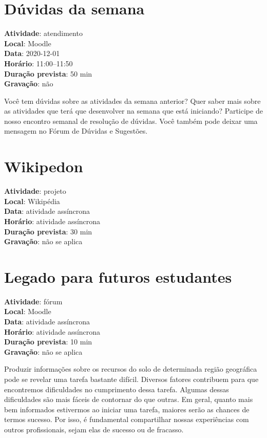 \documentclass[
  11pt,
  a4paper,
  dvipsnames]{tufte-book}
\begin{document}
\hypertarget{duxfavidas-da-semana-12}{%
\section{Dúvidas da semana}\label{duxfavidas-da-semana-12}}

\textbf{Atividade}: atendimento\\
\textbf{Local}: Moodle\\
\textbf{Data}: 2020-12-01\\
\textbf{Horário}: 11:00--11:50\\
\textbf{Duração prevista}: 50 min\\
\textbf{Gravação}: não

Você tem dúvidas sobre as atividades da semana anterior? Quer saber mais sobre as atividades que terá que desenvolver na semana que está iniciando? Participe de nosso encontro semanal de resolução de dúvidas. Você também pode deixar uma mensagem no Fórum de Dúvidas e Sugestões.

\hypertarget{wikipedon-9}{%
\section{Wikipedon}\label{wikipedon-9}}

\textbf{Atividade}: projeto\\
\textbf{Local}: Wikipédia\\
\textbf{Data}: atividade assíncrona\\
\textbf{Horário}: atividade assíncrona\\
\textbf{Duração prevista}: 30 min\\
\textbf{Gravação}: não se aplica

\hypertarget{legado-para-futuros-estudantes}{%
\section{Legado para futuros estudantes}\label{legado-para-futuros-estudantes}}

\textbf{Atividade}: fórum\\
\textbf{Local}: Moodle\\
\textbf{Data}: atividade assíncrona\\
\textbf{Horário}: atividade assíncrona\\
\textbf{Duração prevista}: 10 min\\
\textbf{Gravação}: não se aplica

Produzir informações sobre os recursos do solo de determinada região geográfica pode se revelar uma tarefa bastante difícil. Diversos fatores contribuem para que encontremos dificuldades no cumprimento dessa tarefa. Algumas dessas dificuldades são mais fáceis de contornar do que outras. Em geral, quanto mais bem informados estivermos ao iniciar uma tarefa, maiores serão as chances de termos sucesso. Por isso, é fundamental compartilhar nossas experiências com outros profissionais, sejam elas de sucesso ou de fracasso.
\end{document}

